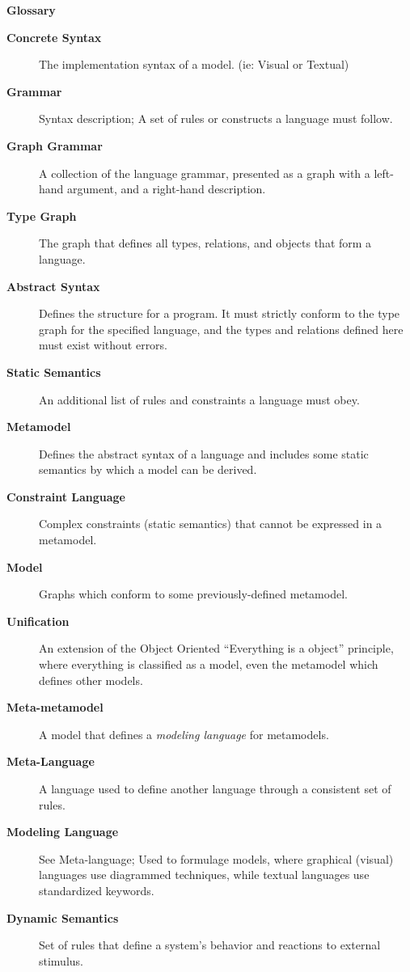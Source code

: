 \newpage
{}
{}

\vspace{1cm}
{\Huge \bf Glossary}
\vspace{1cm}

\begin{description}

\item[\bf Concrete Syntax]
The implementation syntax of a model. (ie: Visual or Textual)

\item[\bf Grammar] 
Syntax description; A set of rules or constructs a language must follow.

\item[\bf Graph Grammar] 
A collection of the language grammar, presented as a graph with a left-hand argument, and a right-hand description.

\item[\bf Type Graph] 
The graph that defines all types, relations, and objects that form a language.

\item[\bf Abstract Syntax] 
Defines the structure for a program. It must strictly conform to the type graph for the specified language, and the types and relations defined here must exist
without errors.

\item[\bf Static Semantics] 
An additional list of rules and constraints a language must obey.

\item[\bf Metamodel] 
Defines the abstract syntax of a language and includes some static semantics by which a model can be derived.

\item[\bf Constraint Language] 
Complex constraints (static semantics) that cannot be expressed in a metamodel.

\item[\bf Model] 
Graphs which conform to some previously-defined metamodel.

\item[\bf Unification]  
An extension of the Object Oriented ``Everything is a object'' principle, where everything is classified as a model, even the metamodel which defines other models.

\item[\bf Meta-metamodel] 
A model that defines a \emph{modeling language} for metamodels.

\item[\bf Meta-Language] 
A language used to define another language through a consistent set of rules. 

\item[\bf Modeling Language] 
See Meta-language; Used to formulage models, where graphical (visual) languages use diagrammed techniques, while textual languages use standardized keywords.

\item[\bf Dynamic Semantics] 
Set of rules that define a system's behavior and reactions to external stimulus.

\end{description}